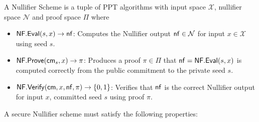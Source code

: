 \begin{definition}[Nullifier]
A Nullifier Scheme is a tuple of PPT algorithms with input space $\mathcal{X}$, nullifier space $\mathcal{N}$ and proof space $\Pi$ where
\begin{itemize}
    \item $\mathsf{NF.Eval}(s,x) \to \mathsf{nf}$: Computes the Nullifier output $\mathsf{nf} \in \mathcal{N}$ for input $x \in \mathcal{X}$ using seed $s$.
    \item $\mathsf{NF.Prove}(\mathsf{cm}_s, x) \to \pi$: Produces a proof $\pi \in \Pi$ that $\mathsf{nf} = \mathsf{NF.Eval}(s,x)$ is computed correctly from the public commitment to the private seed $s$.
    \item $\mathsf{NF.Verify}(\mathsf{cm},x,\mathsf{nf},\pi) \to \{0,1\}$: Verifies that $\mathsf{nf}$ is the correct Nullifier output for input $x$, committed seed $s$ using proof $\pi$.
\end{itemize}
    
\end{definition}

A secure Nullifier scheme must satisfy the following properties:

